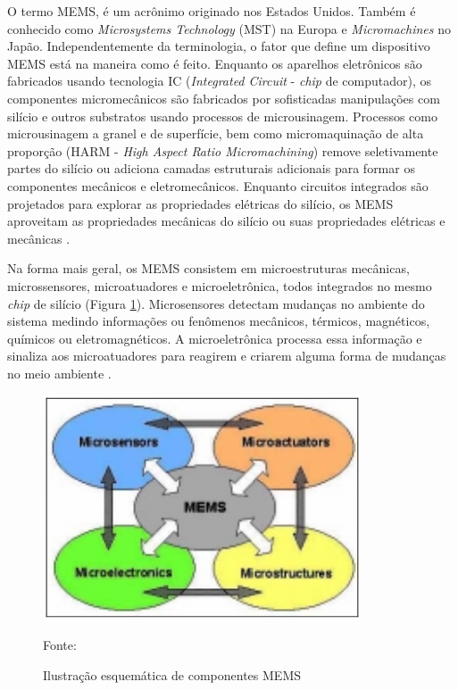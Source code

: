 		O termo MEMS, é um acrônimo originado nos Estados Unidos. Também é conhecido como \textit{Microsystems Technology} (MST) na Europa e \textit{Micromachines} no Japão. Independentemente da terminologia, o fator que define um dispositivo MEMS está na maneira como é feito. Enquanto os aparelhos eletrônicos são fabricados usando tecnologia IC (\textit{Integrated Circuit} - \textit{chip} de computador), os componentes micromecânicos são fabricados por sofisticadas manipulações com silício e outros substratos usando processos de microusinagem. Processos como microusinagem a granel e de superfície, bem como micromaquinação de alta proporção (HARM - \textit{High Aspect Ratio Micromachining}) remove seletivamente partes do silício ou adiciona camadas estruturais adicionais para formar os componentes mecânicos e eletromecânicos. Enquanto circuitos integrados são projetados para explorar as propriedades elétricas do silício, os MEMS aproveitam as propriedades mecânicas do silício ou suas propriedades elétricas e mecânicas \cite{prime2002}.

		Na forma mais geral, os MEMS consistem em microestruturas mecânicas, microssensores, microatuadores e microeletrônica, todos integrados no mesmo \textit{chip} de silício (Figura \ref{esquematico_mems}). Microsensores detectam mudanças no ambiente do sistema medindo informações ou fenômenos mecânicos, térmicos, magnéticos, químicos ou eletromagnéticos. A microeletrônica processa essa informação e sinaliza aos microatuadores para reagirem e criarem alguma forma de mudanças no meio ambiente \cite{prime2002}.

		\begin{figure}[h!]
			\centering
			\includegraphics[keepaspectratio=true,scale=0.7
			]{figuras/esquematico_mems.png}
			\caption{Ilustração esquemática de componentes MEMS}
			Fonte: \cite{prime2002}
			\label{esquematico_mems}
		\end{figure}

